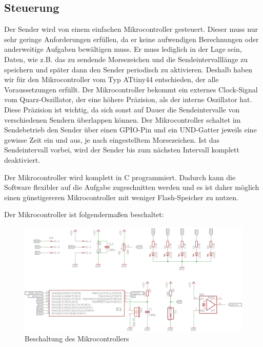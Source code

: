 \subsection{Steuerung}
Der Sender wird von einem einfachen Mikrocontroller gesteuert. Dieser muss nur
sehr geringe Anforderungen erfüllen, da er keine aufwendigen Berechnungen oder anderweitige
Aufgaben bewältigen muss. Er muss lediglich in der Lage sein, Daten, wie z.B. das
zu sendende Morsezeichen und die Sendeintervalllänge zu speichern und später dann
den Sender periodisch zu aktivieren. Deshalb haben wir für den Mikrocontroller vom
Typ ATtiny44 entschieden, der alle Voraussetzungen erfüllt. Der Mikrocontroller bekommt
ein externes Clock-Signal vom Quarz-Oszillator, der eine höhere Präzision, als der interne
Oszillator hat. Diese Präzision ist wichtig, da sich sonst auf Dauer die Sendeintervalle von
verschiedenen Sendern überlappen können. Der Mikrocontroller schaltet im Sendebetrieb den Sender
über einen GPIO-Pin und ein UND-Gatter jeweils eine gewisse Zeit ein und aus, je nach eingestelltem
Morsezeichen. Ist das Sendeintervall vorbei, wird der Sender bis zum nächsten Intervall komplett
deaktiviert.

Der Mikrocontroller wird komplett in C programmiert. Dadurch kann die Software flexibler auf die Aufgabe zugeschnitten
werden und es ist daher möglich einen günstigereren Mikrocontroller mit weniger Flash-Speicher zu nutzen.

Der Mikrocontroller ist folgendermaßen beschaltet:

\begin{figure}[H]
\includegraphics[scale=0.9]{res/Controller.png}
\caption{Beschaltung des Mikrocontrollers}
\end{figure}

